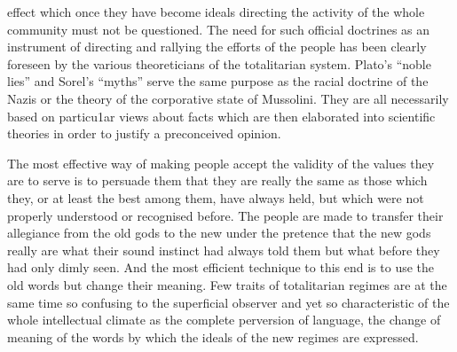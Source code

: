 \documentclass[11pt,openany]{book}
\begin{document}
effect which once they have become ideals directing the activity of the whole community must not be questioned. The need for such official doctrines as an instrument of directing and rallying the efforts of the people has been clearly foreseen by the various theoreticians of the totalitarian system. Plato's ``noble lies'' and Sorel's ``myths'' serve the same purpose as the racial doctrine of the Nazis or the theory of the corporative state of Mussolini. They are all necessarily based on particu1ar views about facts which are then elaborated into scientific theories in order to justify a preconceived opinion.

\begin{center}\textasteriskcentered\hspace{0.9em}\textasteriskcentered\hspace{0.9em}\textasteriskcentered\end{center}

\begin{center}\textasteriskcentered\hspace{0.9em}\textasteriskcentered\hspace{0.9em}\textasteriskcentered\end{center}

\begin{center}\textasteriskcentered\hspace{0.9em}\textasteriskcentered\hspace{0.9em}\textasteriskcentered\end{center}

\begin{center}\textasteriskcentered\hspace{0.9em}\textasteriskcentered\hspace{0.9em}\textasteriskcentered\end{center}

\begin{center}\textasteriskcentered\hspace{0.9em}\textasteriskcentered\hspace{0.9em}\textasteriskcentered\end{center}

The most effective way of making people accept the validity of the values they are to serve is to persuade them that they are really the same as those which they, or at least the best among them, have always held, but which were not properly understood or recognised before. The people are made to transfer their allegiance from the old gods to the new under the pretence that the new gods really are what their sound instinct had always told them but what before they had only dimly seen. And the most efficient technique to this end is to use the old words but change their meaning. Few traits of totalitarian regimes are at the same time so confusing to the superficial observer and yet so characteristic of the whole intellectual climate as the complete perversion of language, the change of meaning of the words by which the ideals of the new regimes are expressed.
\end{document}
